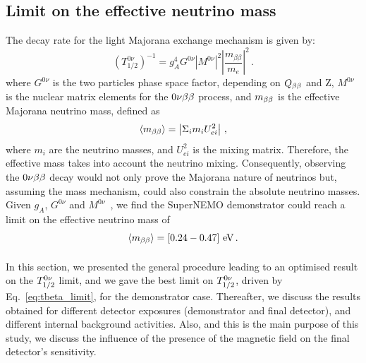 
\subsection{Limit on the effective neutrino mass}

The decay rate for the light Majorana exchange mechanism is given by:
\begin{equation}
  (T_{1/2}^{0\nu})^{-1} = g_{A}^{4}G^{0\nu}|M^{0\nu}|^{2}\left\lvert\dfrac{m_{\beta\beta}}{m_{e}}\right\rvert^{2}\,.
\end{equation}
where $G^{0\nu}$ is the two particles phase space factor, depending on $Q_{\beta\beta}$ and Z, $M^{0\nu}$ is the nuclear matrix elements for the $0\nu\beta\beta$ process, and $m_{\beta\beta}$ is the effective Majorana neutrino mass, defined as
\begin{equation}
  \langle m_{\beta\beta} \rangle = \left\vert \Sigma_{i}m_{i}U^{2}_{ei} \right\vert \,,
\end{equation}
where $m_{i}$ are the neutrino masses, and $U^{2}_{ei}$ is the mixing matrix.
Therefore, the effective mass takes into account the neutrino mixing.
Consequently, observing the $0\nu\beta\beta$ decay would not only prove the Majorana nature of neutrinos but, assuming the mass mechanism, could also constrain the absolute neutrino masses.
Given $g_{A}$, $G^{0\nu}$ and $M^{0\nu}$~\cite{PhysRevC.85.034316}\cite{MENENDEZ2009139}\cite{PhysRevLett.116.112502}\cite{PhysRevC.91.034304}\cite{PhysRevC.91.024613}\cite{PhysRevC.87.045501}\cite{PhysRevLett.111.142501}\cite{PhysRevC.91.024316}\cite{PhysRevC.82.064310}\cite{PhysRevC.83.034320}, we find the SuperNEMO demonstrator could reach a limit on the effective neutrino mass of
\begin{equation}
\langle m_{\beta\beta}\rangle = [0.24-0.47]~\text{eV}\,.
\end{equation}




\paragraph{}
In this section, we presented the general procedure leading to an optimised result on the $T_{1/2}^{0\nu}$ limit, and we gave the best limit on $T_{1/2}^{0\nu}$, driven by Eq.~\eqref{eq:tbeta_limit}, for the demonstrator case.
Thereafter, we discuss the results obtained for different detector exposures (demonstrator and final detector), and different internal background activities.
Also, and this is the main purpose of this study, we discuss the influence of the presence of the magnetic field on the final detector's sensitivity.


